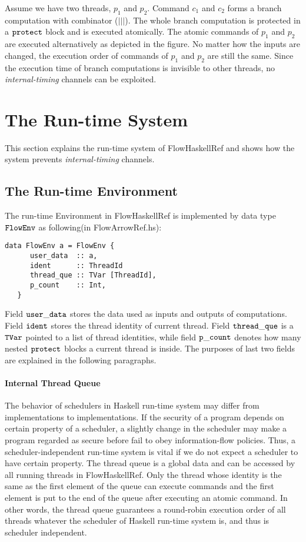 \documentclass{report}
\newcommand{\co}[1]{$\cod{#1}$}
\begin{document}
Assume we have two threads, $p_1$ and $p_2$. Command $c_1$ and $c_2$ forms a branch computation with combinator
($|||$). The whole branch computation is protected in a \co{protect} block and is executed atomically.
The atomic commands of $p_1$ and $p_2$ are executed alternatively as depicted in the figure.
No matter how the inputs are changed, the execution order of commands of $p_1$ and $p_2$ are still the same.
Since the execution time of branch computations is invisible to other threads, no {\em internal-timing}
channels can be exploited.

\section{The Run-time System}
\label{chap7:runtime}

This section explains the run-time system of FlowHaskellRef
and shows how the system prevents {\em internal-timing} channels.

\subsection{The Run-time Environment}
The run-time Environment in FlowHaskellRef is implemented by data type \co{FlowEnv} 
as following(in FlowArrowRef.hs):
\begin{Verbatim}[fontsize=\small]
data FlowEnv a = FlowEnv {
      user_data  :: a,                    
      ident      :: ThreadId        
      thread_que :: TVar [ThreadId],      
      p_count    :: Int,                   
   }
\end{Verbatim}
Field \co{user\_data} stores the data used as inputs and outputs of computations. 
Field \co{ident} stores the thread identity of current thread. 
Field \co{thread\_que} is a \co{TVar} pointed to a list of thread identities, while
field \co{p\_count} denotes how many nested \co{protect} blocks a current thread is inside.
The purposes of last two fields are explained in the following paragraphs.

\paragraph{Internal Thread Queue}
The behavior of schedulers in Haskell run-time system may differ from implementations to implementations. 
If the security of a program depends on certain property of a scheduler, a slightly change in the
scheduler may make a program regarded as secure before fail to obey information-flow policies.
Thus, a scheduler-independent run-time system is vital if we do not expect a scheduler to have certain property.
The thread queue is a global data
and can be accessed by all running threads in FlowHaskellRef. 
Only the thread whose identity is the same as the first element of the queue
can execute commands and the first element is put to the end of the queue after executing an atomic command.
In other words, the thread queue guarantees a round-robin execution order of all threads whatever
the scheduler of Haskell run-time system is, and thus is scheduler independent.
\end{document}
